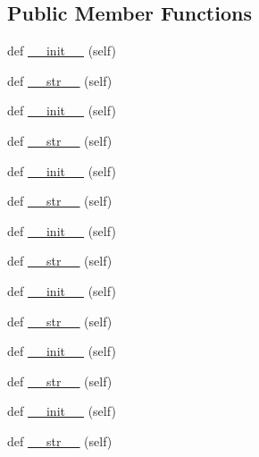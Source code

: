 \subsection*{Public Member Functions}
\begin{DoxyCompactItemize}
\item 
def \hyperlink{classwaflib_1_1_utils_1_1_timer_acfedd95753b896b464edea4c4ad06fd2}{\+\_\+\+\_\+init\+\_\+\+\_\+} (self)
\item 
def \hyperlink{classwaflib_1_1_utils_1_1_timer_aae739d38ffcadf055382c419da8680d8}{\+\_\+\+\_\+str\+\_\+\+\_\+} (self)
\item 
def \hyperlink{classwaflib_1_1_utils_1_1_timer_acfedd95753b896b464edea4c4ad06fd2}{\+\_\+\+\_\+init\+\_\+\+\_\+} (self)
\item 
def \hyperlink{classwaflib_1_1_utils_1_1_timer_aae739d38ffcadf055382c419da8680d8}{\+\_\+\+\_\+str\+\_\+\+\_\+} (self)
\item 
def \hyperlink{classwaflib_1_1_utils_1_1_timer_acfedd95753b896b464edea4c4ad06fd2}{\+\_\+\+\_\+init\+\_\+\+\_\+} (self)
\item 
def \hyperlink{classwaflib_1_1_utils_1_1_timer_aae739d38ffcadf055382c419da8680d8}{\+\_\+\+\_\+str\+\_\+\+\_\+} (self)
\item 
def \hyperlink{classwaflib_1_1_utils_1_1_timer_acfedd95753b896b464edea4c4ad06fd2}{\+\_\+\+\_\+init\+\_\+\+\_\+} (self)
\item 
def \hyperlink{classwaflib_1_1_utils_1_1_timer_aae739d38ffcadf055382c419da8680d8}{\+\_\+\+\_\+str\+\_\+\+\_\+} (self)
\item 
def \hyperlink{classwaflib_1_1_utils_1_1_timer_acfedd95753b896b464edea4c4ad06fd2}{\+\_\+\+\_\+init\+\_\+\+\_\+} (self)
\item 
def \hyperlink{classwaflib_1_1_utils_1_1_timer_aae739d38ffcadf055382c419da8680d8}{\+\_\+\+\_\+str\+\_\+\+\_\+} (self)
\item 
def \hyperlink{classwaflib_1_1_utils_1_1_timer_acfedd95753b896b464edea4c4ad06fd2}{\+\_\+\+\_\+init\+\_\+\+\_\+} (self)
\item 
def \hyperlink{classwaflib_1_1_utils_1_1_timer_aae739d38ffcadf055382c419da8680d8}{\+\_\+\+\_\+str\+\_\+\+\_\+} (self)
\item 
def \hyperlink{classwaflib_1_1_utils_1_1_timer_acfedd95753b896b464edea4c4ad06fd2}{\+\_\+\+\_\+init\+\_\+\+\_\+} (self)
\item 
def \hyperlink{classwaflib_1_1_utils_1_1_timer_aae739d38ffcadf055382c419da8680d8}{\+\_\+\+\_\+str\+\_\+\+\_\+} (self)
\item 

\end{DoxyCompactItemize}
